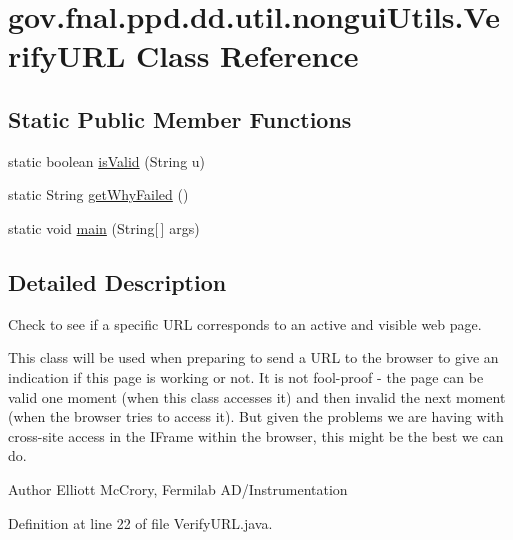 \hypertarget{classgov_1_1fnal_1_1ppd_1_1dd_1_1util_1_1nonguiUtils_1_1VerifyURL}{\section{gov.\-fnal.\-ppd.\-dd.\-util.\-nongui\-Utils.\-Verify\-U\-R\-L Class Reference}
\label{classgov_1_1fnal_1_1ppd_1_1dd_1_1util_1_1nonguiUtils_1_1VerifyURL}
}
\subsection*{Static Public Member Functions}
\begin{DoxyCompactItemize}
\item 
static boolean \hyperlink{classgov_1_1fnal_1_1ppd_1_1dd_1_1util_1_1nonguiUtils_1_1VerifyURL_a7bb140c03fe2d3b8c5db95d5125366f0}{is\-Valid} (String u)
\item 
static String \hyperlink{classgov_1_1fnal_1_1ppd_1_1dd_1_1util_1_1nonguiUtils_1_1VerifyURL_ad2ddb9ba0d5e339d07f58206afd7163e}{get\-Why\-Failed} ()
\item 
static void \hyperlink{classgov_1_1fnal_1_1ppd_1_1dd_1_1util_1_1nonguiUtils_1_1VerifyURL_aeb525d904ceb8db0590f2dcb7f0b8b38}{main} (String\mbox{[}$\,$\mbox{]} args)
\end{DoxyCompactItemize}


\subsection{Detailed Description}
Check to see if a specific U\-R\-L corresponds to an active and visible web page. 

This class will be used when preparing to send a U\-R\-L to the browser to give an indication if this page is working or not. It is not fool-\/proof -\/ the page can be valid one moment (when this class accesses it) and then invalid the next moment (when the browser tries to access it). But given the problems we are having with cross-\/site access in the I\-Frame within the browser, this might be the best we can do. 

\begin{DoxyAuthor}{Author}
Elliott Mc\-Crory, Fermilab A\-D/\-Instrumentation 
\end{DoxyAuthor}


Definition at line 22 of file Verify\-U\-R\-L.\-java.



